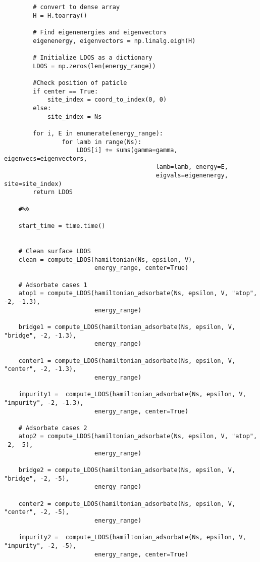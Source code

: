 \begin{verbatim}
        # convert to dense array
        H = H.toarray()   
    
        # Find eigenenergies and eigenvectors
        eigenenergy, eigenvectors = np.linalg.eigh(H)  
    
        # Initialize LDOS as a dictionary
        LDOS = np.zeros(len(energy_range))
        
        #Check position of paticle
        if center == True:
            site_index = coord_to_index(0, 0)
        else:
            site_index = Ns
    
        for i, E in enumerate(energy_range):
                for lamb in range(Ns):
                    LDOS[i] += sums(gamma=gamma, eigenvecs=eigenvectors, 
                                          lamb=lamb, energy=E, 
                                          eigvals=eigenenergy, site=site_index)
        return LDOS
    
    #%%
    
    start_time = time.time()
    
    
    # Clean surface LDOS
    clean = compute_LDOS(hamiltonian(Ns, epsilon, V), 
                         energy_range, center=True)  
    
    # Adsorbate cases 1
    atop1 = compute_LDOS(hamiltonian_adsorbate(Ns, epsilon, V, "atop", -2, -1.3),
                         energy_range)
    
    bridge1 = compute_LDOS(hamiltonian_adsorbate(Ns, epsilon, V, "bridge", -2, -1.3),
                         energy_range)
    
    center1 = compute_LDOS(hamiltonian_adsorbate(Ns, epsilon, V, "center", -2, -1.3),
                         energy_range)
    
    impurity1 =  compute_LDOS(hamiltonian_adsorbate(Ns, epsilon, V, "impurity", -2, -1.3),
                         energy_range, center=True)
    
    # Adsorbate cases 2
    atop2 = compute_LDOS(hamiltonian_adsorbate(Ns, epsilon, V, "atop", -2, -5),
                         energy_range)
    
    bridge2 = compute_LDOS(hamiltonian_adsorbate(Ns, epsilon, V, "bridge", -2, -5),
                         energy_range)
    
    center2 = compute_LDOS(hamiltonian_adsorbate(Ns, epsilon, V, "center", -2, -5),
                         energy_range)
    
    impurity2 =  compute_LDOS(hamiltonian_adsorbate(Ns, epsilon, V, "impurity", -2, -5),
                         energy_range, center=True)
    

\end{verbatim}
